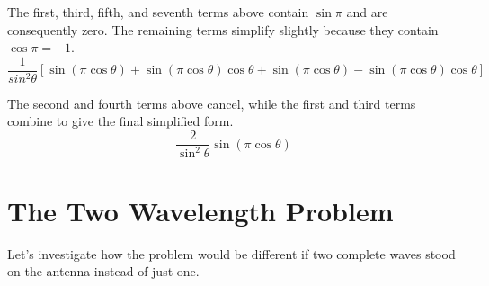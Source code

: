 \documentclass[10pt,a4paper]{article}
\begin{document}
The first, third, fifth, and seventh terms above contain $\sin\pi$ and are consequently zero.  The remaining terms simplify slightly because they contain $\cos\pi=-1$.
\begin{equation}
\frac{1}{sin^2\theta}[
\sin(\pi\cos\theta)
+\sin(\pi\cos\theta)\cos\theta
+\sin(\pi\cos\theta)
-\sin(\pi\cos\theta)\cos\theta
]
\end{equation}

The second and fourth terms above cancel, while the first and third terms combine to give the final simplified form.
\begin{equation}
\frac{2}{\sin^2\theta}\sin(\pi\cos\theta)
\end{equation}

\section{The Two Wavelength Problem}
Let's investigate how the problem would be different if two complete waves stood on the antenna instead of just one.
\end{document}
